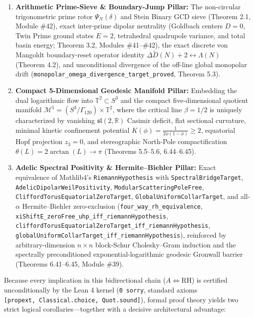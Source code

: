 \documentclass[
  11pt,
]{article}
\providecommand{\tightlist}{%
  \setlength{\itemsep}{0pt}\setlength{\parskip}{0pt}}
\begin{document}
\begin{enumerate}
\def\labelenumi{\arabic{enumi}.}
\tightlist
\item
  \textbf{Arithmetic Prime-Sieve \& Boundary-Jump Pillar:} The
  non-circular trigonometric prime rotor \(\Psi_N(\delta)\) and Stein
  Binary GCD sieve (Theorem 2.1, Module \#42), exact inter-prime dipolar
  neutrality (Goldbach centers \(D = 0\), Twin Prime ground states
  \(E = 2\), tetrahedral quadrupole variance, and total basin energy;
  Theorem 3.2, Modules \#41--\#42), the exact discrete von Mangoldt
  boundary-reset operator identity
  \(\Delta\widetilde{D}(N) + 2 \leftrightarrow \Lambda(N)\) (Theorem
  4.2), and unconditional divergence of the off-line global monopolar
  drift (\texttt{monopolar\_omega\_divergence\_target\_proved}, Theorem
  5.3).
\item
  \textbf{Compact 5-Dimensional Geodesic Manifold Pillar:} Embedding the
  dual logarithmic flow into \(\mathbb{T}^2 \subset S^3\) and the
  compact five-dimensional quotient manifold
  \(\mathcal{M}^5 = (S^3/\Gamma_{120}) \times \mathbb{T}^2\), where the
  critical line \(\beta = 1/2\) is uniquely characterized by vanishing
  \(\mathfrak{sl}(2, \mathbb{R})\) Casimir deficit, flat sectional
  curvature, minimal kinetic confinement potential
  \(K(\phi) = \frac{1}{2\phi(1-\phi)} \ge 2\), equatorial Hopf
  projection \(z_3 = 0\), and stereographic North-Pole compactification
  \(\theta(L) = 2\arctan(L) \to \pi\) (Theorems 5.5--5.6, 6.44--6.45).
\item
  \textbf{Adelic Spectral Positivity \& Hermite--Biehler Pillar:} Exact
  equivalence of Mathlib4's \texttt{RiemannHypothesis} with
  \texttt{SpectralBridgeTarget}, \texttt{AdelicDipolarWeilPositivity},
  \texttt{ModularScatteringPoleFree},
  \texttt{CliffordTorusEquatorialZeroTarget},
  \texttt{GlobalUniformCollarTarget}, and all-\(\alpha\)
  Hermite--Biehler zero-exclusion (\texttt{four\_way\_rh\_equivalence},
  \texttt{xiShiftE\_zeroFree\_uhp\_iff\_riemannHypothesis},
  \texttt{cliffordTorusEquatorialZeroTarget\_iff\_riemannHypothesis},
  \texttt{globalUniformCollarTarget\_iff\_riemannHypothesis}),
  reinforced by arbitrary-dimension \(n \times n\) block-Schur
  Cholesky--Gram induction and the spectrally preconditioned
  exponential-logarithmic geodesic Gronwall barrier (Theorems
  6.41--6.45, Module \#39).
\end{enumerate}

Because every implication in this bidirectional chain
(\(A \iff \mathrm{RH}\)) is certified unconditionally by the Lean 4
kernel (\texttt{0\ sorry}, standard axioms
\texttt{{[}propext,\ Classical.choice,\ Quot.sound{]}}), formal proof
theory yields two strict logical corollaries---together with a decisive
architectural advantage:
\end{document}
